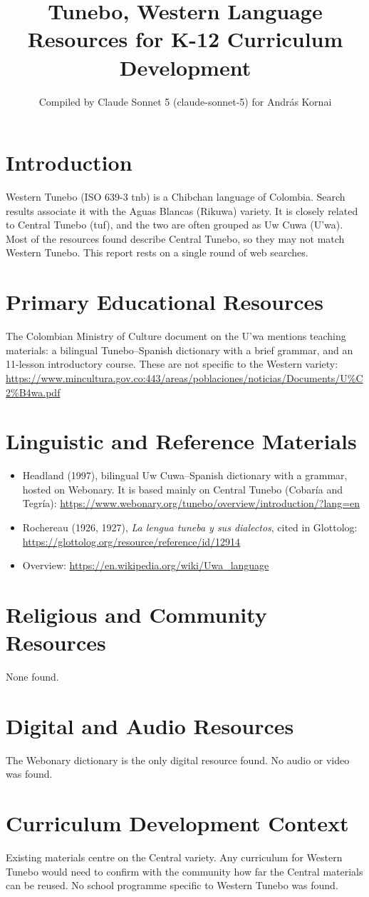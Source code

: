 \documentclass[12pt]{article}
\title{Tunebo, Western Language Resources for K-12 Curriculum Development}
\author{Compiled by Claude Sonnet 5 (claude-sonnet-5) for Andr\'as Kornai}
\date{}
\begin{document}
\maketitle

\section{Introduction}
Western Tunebo (ISO 639-3 tnb) is a Chibchan language of Colombia. Search results associate it with the Aguas Blancas (Rikuwa) variety. It is closely related to Central Tunebo (tuf), and the two are often grouped as Uw Cuwa (U'wa). Most of the resources found describe Central Tunebo, so they may not match Western Tunebo. This report rests on a single round of web searches.

\section{Primary Educational Resources}
The Colombian Ministry of Culture document on the U'wa mentions teaching materials: a bilingual Tunebo--Spanish dictionary with a brief grammar, and an 11-lesson introductory course. These are not specific to the Western variety: \url{https://www.mincultura.gov.co:443/areas/poblaciones/noticias/Documents/U%C2%B4wa.pdf}

\section{Linguistic and Reference Materials}
\begin{itemize}
\item Headland (1997), bilingual Uw Cuwa--Spanish dictionary with a grammar, hosted on Webonary. It is based mainly on Central Tunebo (Cobar\'ia and Tegr\'ia): \url{https://www.webonary.org/tunebo/overview/introduction/?lang=en}
\item Rochereau (1926, 1927), \emph{La lengua tuneba y sus dialectos}, cited in Glottolog: \url{https://glottolog.org/resource/reference/id/12914}
\item Overview: \url{https://en.wikipedia.org/wiki/Uwa_language}
\end{itemize}

\section{Religious and Community Resources}
None found.

\section{Digital and Audio Resources}
The Webonary dictionary is the only digital resource found. No audio or video was found.

\section{Curriculum Development Context}
Existing materials centre on the Central variety. Any curriculum for Western Tunebo would need to confirm with the community how far the Central materials can be reused. No school programme specific to Western Tunebo was found.
\end{document}
